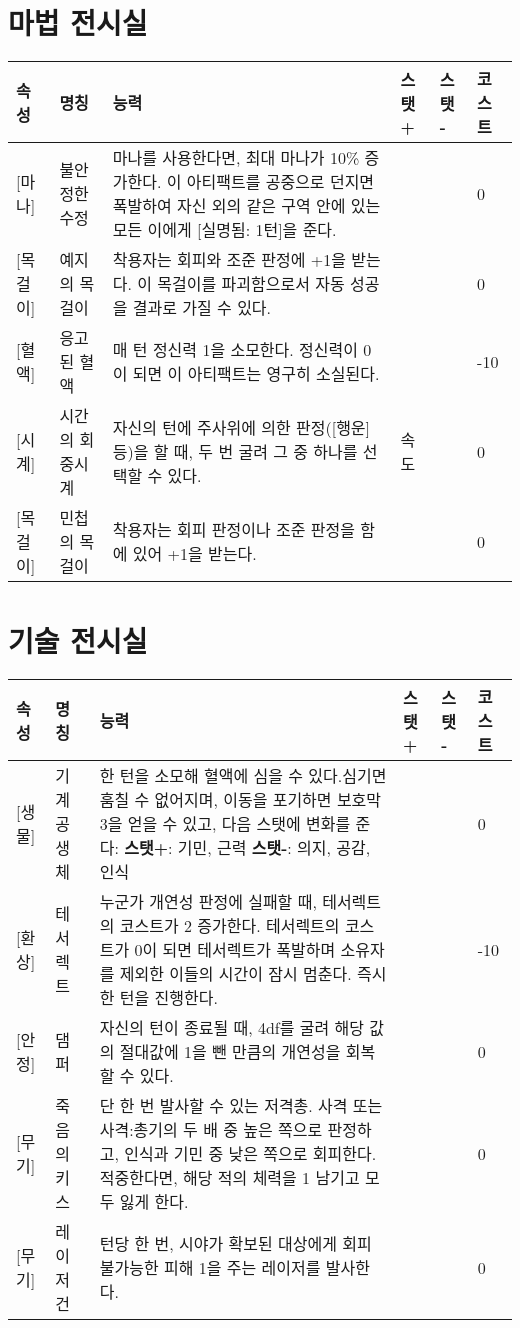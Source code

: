 \documentclass{report}
\begin{document}
	\section*{마법 전시실}
	\begin{tabularx}{\textwidth}{l|l|X|l|l|l}
		\textbf{속성} & \textbf{명칭} & \textbf{능력} & \textbf{스탯 +} & \textbf{스탯 -} & \textbf{코스트} \\ \hline \hline
		[마법][마나]& 불안정한 수정 & 마나를 사용한다면, 최대 마나가 10\% 증가한다. 이 아티팩트를 공중으로 던지면 폭발하여 자신 외의 같은 구역 안에 있는 모든 이에게 [실명됨: 1턴]을 준다. &  & & 0 \\ \hline
		[마법][목걸이]& 예지의 목걸이 & 착용자는 회피와 조준 판정에 +1을 받는다. 이 목걸이를 파괴함으로서 자동 성공을 결과로 가질 수 있다. &  & & 0 \\ \hline
		[흑마법][혈액] & 응고된 혈액 & 매 턴 정신력 1을 소모한다. 정신력이 0이 되면 이 아티팩트는 영구히 소실된다. &  & & -10 \\ \hline
		[마법][시계] & 시간의 회중시계 & 자신의 턴에 주사위에 의한 판정([행운] 등)을 할 때, 두 번 굴려 그 중 하나를 선택할 수 있다.& 속도 & & 0 \\ \hline
		[마법][목걸이]& 민첩의 목걸이 & 착용자는 회피 판정이나 조준 판정을 함에 있어 +1을 받는다. &  & & 0 \\
	\end{tabularx}
	
	\section*{기술 전시실}
	\begin{tabularx}{\textwidth}{l|l|X|l|l|l}
		\textbf{속성} & \textbf{명칭} & \textbf{능력} & \textbf{스탯 +} & \textbf{스탯 -} & \textbf{코스트}\\ \hline \hline
		[기술][생물]& 기계 공생체 & 한 턴을 소모해 혈액에 심을 수 있다.\newline 심기면 훔칠 수 없어지며, 이동을 포기하면 보호막 3을 얻을 수 있고, 다음 스탯에 변화를 준다: \newline \textbf{스탯+}: 기민, 근력 \newline \textbf{스탯-}: 의지, 공감, 인식  &   &     & 0 \\ \hline
		[기술][환상]& 테서렉트 & 누군가 개연성 판정에 실패할 때, 테서렉트의 코스트가 2 증가한다. \newline 테서렉트의 코스트가 0이 되면 테서렉트가 폭발하며 소유자를 제외한 이들의 시간이 잠시 멈춘다. 즉시 한 턴을 진행한다. &  &      & -10 \\ \hline
		[기술][안정]& 댐퍼 & 자신의 턴이 종료될 때, 4df를 굴려 해당 값의 절대값에 1을 뺀 만큼의 개연성을 회복할 수 있다.  &  &      & 0 \\ \hline
		[기술][무기]& 죽음의 키스 & 단 한 번 발사할 수 있는 저격총. 사격 또는 사격:총기의 두 배 중 높은 쪽으로 판정하고, 인식과 기민 중 낮은 쪽으로 회피한다. 적중한다면, 해당 적의 체력을 1 남기고 모두 잃게 한다.  &  &      & 0 \\ \hline
		[기술][무기]& 레이저 건 & 턴당 한 번, 시야가 확보된 대상에게 회피 불가능한 피해 1을 주는 레이저를 발사한다. &  & & 0\\
	\end{tabularx}
	
\end{document}
